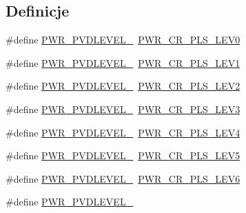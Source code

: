 \subsection*{Definicje}
\begin{DoxyCompactItemize}
\item 
\#define \hyperlink{group___p_w_r___p_v_d__detection__level_gaddf4616a143ac3481f3043f2a4c21c18}{P\+W\+R\+\_\+\+P\+V\+D\+L\+E\+V\+E\+L\+\_}~\hyperlink{group___peripheral___registers___bits___definition_gacb6b904b20d7e4fff958c75748861216}{P\+W\+R\+\_\+\+C\+R\+\_\+\+P\+L\+S\+\_\+\+L\+E\+V0}
\item 
\#define \hyperlink{group___p_w_r___p_v_d__detection__level_ga06e55b20a8777594f1a91ee71fac1f79}{P\+W\+R\+\_\+\+P\+V\+D\+L\+E\+V\+E\+L\+\_}~\hyperlink{group___peripheral___registers___bits___definition_ga15b71263f73f0c4e53ca91fc8d096818}{P\+W\+R\+\_\+\+C\+R\+\_\+\+P\+L\+S\+\_\+\+L\+E\+V1}
\item 
\#define \hyperlink{group___p_w_r___p_v_d__detection__level_gab26bb78650bbaef26ac9f9123c791cc7}{P\+W\+R\+\_\+\+P\+V\+D\+L\+E\+V\+E\+L\+\_}~\hyperlink{group___peripheral___registers___bits___definition_ga2ea128abc2fc4252b53d09ca2850e69e}{P\+W\+R\+\_\+\+C\+R\+\_\+\+P\+L\+S\+\_\+\+L\+E\+V2}
\item 
\#define \hyperlink{group___p_w_r___p_v_d__detection__level_ga7b751743b3e29c237e6a0e1d7bdd0503}{P\+W\+R\+\_\+\+P\+V\+D\+L\+E\+V\+E\+L\+\_}~\hyperlink{group___peripheral___registers___bits___definition_ga9c1782980a2fb12de80058729a74f174}{P\+W\+R\+\_\+\+C\+R\+\_\+\+P\+L\+S\+\_\+\+L\+E\+V3}
\item 
\#define \hyperlink{group___p_w_r___p_v_d__detection__level_ga03c0d3ae547deb1a51b8acafac101698}{P\+W\+R\+\_\+\+P\+V\+D\+L\+E\+V\+E\+L\+\_}~\hyperlink{group___peripheral___registers___bits___definition_ga0fe79f097ea6c30a4ccf69ed3e177f85}{P\+W\+R\+\_\+\+C\+R\+\_\+\+P\+L\+S\+\_\+\+L\+E\+V4}
\item 
\#define \hyperlink{group___p_w_r___p_v_d__detection__level_ga46a1476440945c2b6426b4973172f24b}{P\+W\+R\+\_\+\+P\+V\+D\+L\+E\+V\+E\+L\+\_}~\hyperlink{group___peripheral___registers___bits___definition_ga326781d09a07b4d215424fbbae11b7b2}{P\+W\+R\+\_\+\+C\+R\+\_\+\+P\+L\+S\+\_\+\+L\+E\+V5}
\item 
\#define \hyperlink{group___p_w_r___p_v_d__detection__level_ga5dda7d0ac3fd3d606666455ca3c8f537}{P\+W\+R\+\_\+\+P\+V\+D\+L\+E\+V\+E\+L\+\_}~\hyperlink{group___peripheral___registers___bits___definition_gaaff17e9c7fe7d837523b1e9a2f4e9baf}{P\+W\+R\+\_\+\+C\+R\+\_\+\+P\+L\+S\+\_\+\+L\+E\+V6}
\item 
\#define \hyperlink{group___p_w_r___p_v_d__detection__level_ga2c5cd8dd26b13bdf0164c1f7596b4bfd}{P\+W\+R\+\_\+\+P\+V\+D\+L\+E\+V\+E\+L\+\_}
\end{DoxyCompactItemize}


